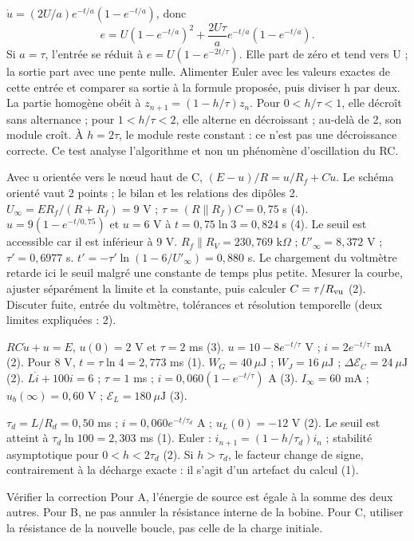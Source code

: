 $\dot u=(2U/a)e^{-t/a}(1-e^{-t/a})$, donc
\[e=U(1-e^{-t/a})^2+\frac{2U\tau}{a}e^{-t/a}(1-e^{-t/a}).\]
Si $a=\tau$, l’entrée se réduit à $e=U(1-e^{-2t/\tau})$. Elle part de zéro et tend vers U ; la sortie part avec une pente nulle. Alimenter Euler avec les valeurs exactes de cette entrée et comparer sa sortie à la formule proposée, puis diviser h par deux.
La partie homogène obéit à $z_{n+1}=(1-h/\tau)z_n$. Pour $0<h/\tau<1$, elle décroît sans alternance ; pour $1<h/\tau<2$, elle alterne en décroissant ; au-delà de 2, son module croît. À $h=2\tau$, le module reste constant : ce n’est pas une décroissance correcte. Ce test analyse l’algorithme et non un phénomène d’oscillation du RC.


Avec u orientée vers le nœud haut de C, $(E-u)/R=u/R_f+C\dot u$. Le schéma orienté vaut 2 points ; le bilan et les relations des dipôles 2.
$U_\infty=ER_f/(R+R_f)=9$ V ; $\tau=(R\parallel R_f)C=0{,}75$ s (4). $u=9(1-e^{-t/0{,}75})$ et $u=6$ V à $t=0{,}75\ln3=0{,}824$ s (4). Le seuil est accessible car il est inférieur à 9 V.
$R_f\parallel R_V=230{,}769$ k$\Omega$ ; $U'_\infty=8{,}372$ V ; $\tau'=0{,}6977$ s. $t'=-\tau'\ln(1-6/U'_\infty)=0{,}880$ s. Le chargement du voltmètre retarde ici le seuil malgré une constante de temps plus petite.
Mesurer la courbe, ajuster séparément la limite et la constante, puis calculer $C=\tau/R_{\rm vu}$ (2). Discuter fuite, entrée du voltmètre, tolérances et résolution temporelle (deux limites expliquées : 2).


$RC\dot u+u=E$, $u(0)=2$ V et $\tau=2$ ms (3). $u=10-8e^{-t/\tau}$ V ; $i=2e^{-t/\tau}$ mA (2). Pour 8 V, $t=\tau\ln4=2{,}773$ ms (1). $W_G=40\ \mu\mathrm{ J}$ ; $W_J=16\ \mu\mathrm{ J}$ ; $\Delta\mathcal E_C=24\ \mu\mathrm{ J}$ (2).
$L\dot i+100i=6$ ; $\tau=1$ ms ; $i=0{,}060(1-e^{-t/\tau})$ A (3). $I_\infty=60$ mA ; $u_b(\infty)=0{,}60$ V ; $\mathcal E_L=180\ \mu\mathrm{ J}$ (3).


$\tau_d=L/R_d=0{,}50$ ms ; $i=0{,}060e^{-t/\tau_d}$ A ; $u_L(0)=-12$ V (2). Le seuil est atteint à $\tau_d\ln100=2{,}303$ ms (1). Euler : $i_{n+1}=(1-h/\tau_d)i_n$ ; stabilité asymptotique pour $0<h<2\tau_d$ (2). Si $h>\tau_d$, le facteur change de signe, contrairement à la décharge exacte : il s’agit d’un artefact du calcul (1).
\begin{methode}{Vérifier la correction}
Pour A, l’énergie de source est égale à la somme des deux autres. Pour B, ne pas annuler la résistance interne de la bobine. Pour C, utiliser la résistance de la nouvelle boucle, pas celle de la charge initiale.
\end{methode}


